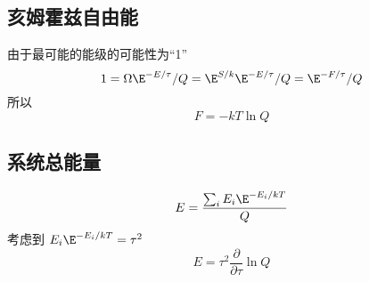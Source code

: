 
\subsection{亥姆霍兹自由能}
由于最可能的能级的可能性为“1”
\begin{equation}
1 = \Omega {\E^{ - E/\tau }}/Q = {\E^{S/k}}{\E^{ - E/\tau }}/Q = {\E^{ - F/\tau }}/Q
\end{equation}
所以
\begin{equation}
F = -kT\ln Q
\end{equation}

\subsection{系统总能量}
\begin{equation}
E = \frac{\sum_i E_i \E^{-E_i/kT}}{Q}
\end{equation}
考虑到 $E_i \E^{-E_i/kT} = \tau^2$ %
\begin{equation}
E = {\tau ^2}\frac{\partial }{{\partial \tau }}\ln Q
\end{equation}